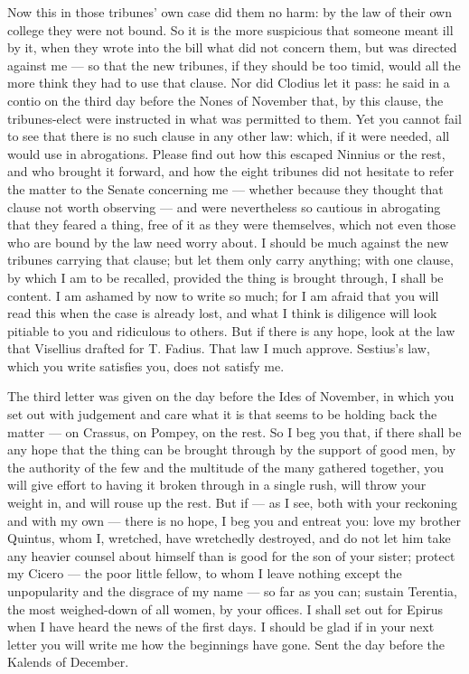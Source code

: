  Now this in those tribunes' own case did them no harm: by the law of their own college they were not bound. So it is the more suspicious that someone meant ill by it, when they wrote into the bill what did not concern them, but was directed against me --- so that the new tribunes, if they should be too timid, would all the more think they had to use that clause. Nor did Clodius let it pass: he said in a contio on the third day before the Nones of November that, by this clause, the tribunes-elect were instructed in what was permitted to them. Yet you cannot fail to see that there is no such clause in any other law: which, if it were needed, all would use in abrogations. Please find out how this escaped Ninnius or the rest, and who brought it forward, and how the eight tribunes did not hesitate to refer the matter to the Senate concerning me --- whether because they thought that clause not worth observing --- and were nevertheless so cautious in abrogating that they feared a thing, free of it as they were themselves, which not even those who are bound by the law need worry about. I should be much against the new tribunes carrying that clause; but let them only carry anything; with one clause, by which I am to be recalled, provided the thing is brought through, I shall be content. I am ashamed by now to write so much; for I am afraid that you will read this when the case is already lost, and what I think is diligence will look pitiable to you and ridiculous to others. But if there is any hope, look at the law that Visellius drafted for T. Fadius. That law I much approve. Sestius's law, which you write satisfies you, does not satisfy me.

 The third letter was given on the day before the Ides of November, in which you set out with judgement and care what it is that seems to be holding back the matter --- on Crassus, on Pompey, on the rest. So I beg you that, if there shall be any hope that the thing can be brought through by the support of good men, by the authority of the few and the multitude of the many gathered together, you will give effort to having it broken through in a single rush, will throw your weight in, and will rouse up the rest. But if --- as I see, both with your reckoning and with my own --- there is no hope, I beg you and entreat you: love my brother Quintus, whom I, wretched, have wretchedly destroyed, and do not let him take any heavier counsel about himself than is good for the son of your sister; protect my Cicero --- the poor little fellow, to whom I leave nothing except the unpopularity and the disgrace of my name --- so far as you can; sustain Terentia, the most weighed-down of all women, by your offices. I shall set out for Epirus when I have heard the news of the first days. I should be glad if in your next letter you will write me how the beginnings have gone. Sent the day before the Kalends of December.
